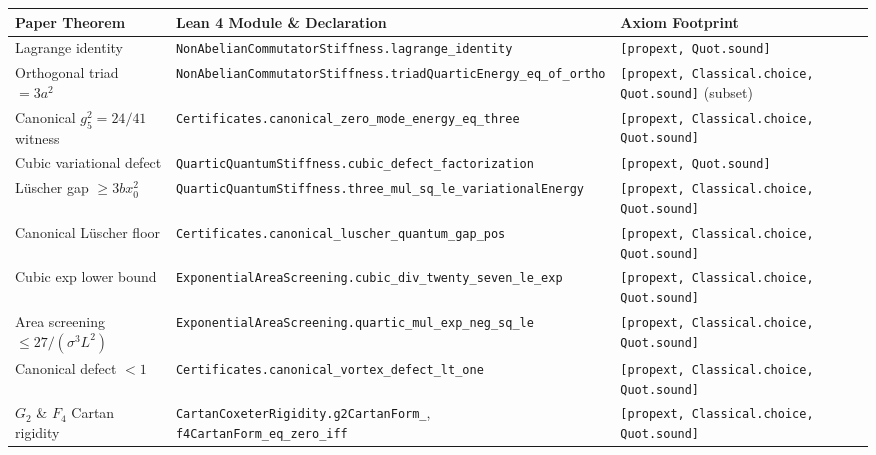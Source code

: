 \documentclass[11pt,a4paper]{article}
\begin{document}
\begin{table}[ht]
\centering
\scriptsize
\begin{tabular}{@{}p{4.3cm}p{6.6cm}p{3.4cm}@{}}
\toprule
Paper Theorem & Lean 4 Module \& Declaration & Axiom Footprint \\
\midrule
Lagrange identity & \texttt{NonAbelianCommutatorStiffness.}\newline\texttt{lagrange\_identity} & \texttt{[propext, Quot.sound]} \\
Orthogonal triad $= 3a^2$ & \texttt{NonAbelianCommutatorStiffness.}\newline\texttt{triadQuarticEnergy\_eq\_of\_ortho} & \texttt{[propext, Classical.choice,} \texttt{Quot.sound]} (subset) \\
Canonical $g_5^2 = 24/41$ witness & \texttt{Certificates.}\newline\texttt{canonical\_zero\_mode\_energy\_eq\_three} & \texttt{[propext, Classical.choice,} \texttt{Quot.sound]} \\
Cubic variational defect & \texttt{QuarticQuantumStiffness.}\newline\texttt{cubic\_defect\_factorization} & \texttt{[propext, Quot.sound]} \\
L\"uscher gap $\ge 3 b x_0^2$ & \texttt{QuarticQuantumStiffness.}\newline\texttt{three\_mul\_sq\_le\_variationalEnergy} & \texttt{[propext, Classical.choice,} \texttt{Quot.sound]} \\
Canonical L\"uscher floor & \texttt{Certificates.}\newline\texttt{canonical\_luscher\_quantum\_gap\_pos} & \texttt{[propext, Classical.choice,} \texttt{Quot.sound]} \\
Cubic exp lower bound & \texttt{ExponentialAreaScreening.}\newline\texttt{cubic\_div\_twenty\_seven\_le\_exp} & \texttt{[propext, Classical.choice,} \texttt{Quot.sound]} \\
Area screening $\le 27/(\sigma^3 L^2)$ & \texttt{ExponentialAreaScreening.}\newline\texttt{quartic\_mul\_exp\_neg\_sq\_le} & \texttt{[propext, Classical.choice,} \texttt{Quot.sound]} \\
Canonical defect $< 1$ & \texttt{Certificates.}\newline\texttt{canonical\_vortex\_defect\_lt\_one} & \texttt{[propext, Classical.choice,} \texttt{Quot.sound]} \\
$G_2$ \& $F_4$ Cartan rigidity & \texttt{CartanCoxeterRigidity.}\newline\texttt{g2CartanForm\_}, \texttt{f4CartanForm\_eq\_zero\_iff} & \texttt{[propext, Classical.choice,} \texttt{Quot.sound]} \\

\end{tabular}
\end{table}
\end{document}
